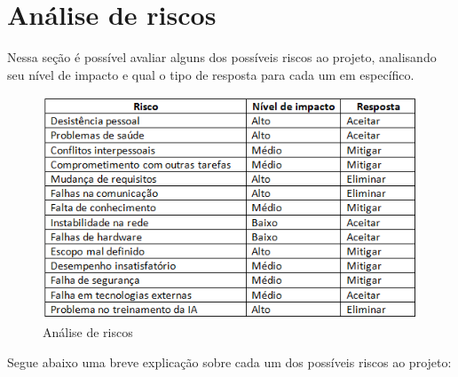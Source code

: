 \section{Análise de riscos}
Nessa seção é possível avaliar alguns dos possíveis riscos ao projeto, analisando seu nível de impacto e qual o tipo de resposta para cada um em específico.

\begin{figure}[!htb]
 	    \centering
 	    \caption{\label{logo}Análise de riscos}
 	    \includegraphics[width=15cm]{img/riscos.png}
\end{figure}

Segue abaixo uma breve explicação sobre cada um dos possíveis riscos ao projeto:

